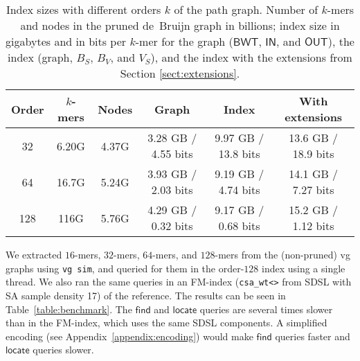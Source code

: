\documentclass[a4paper,UKenglish]{lipics-v2016}
\newcommand{\find}{\ensuremath{\mathsf{find}}}
\newcommand{\locate}{\ensuremath{\mathsf{locate}}}
\newcommand{\kmer}[1]{$#1$\nobreakdash-mer}
\newcommand{\orderk}[1]{order\nobreakdash-$#1$}
\newcommand{\BWT}{\ensuremath{\mathsf{BWT}}}
\newcommand{\bvIN}{\ensuremath{\mathsf{IN}}}
\newcommand{\bvOUT}{\ensuremath{\mathsf{OUT}}}
\begin{document}
\begin{table}[t!]
\begin{center}
\caption{Index sizes with different orders $k$ of the path graph. Number of \kmer{k}s and nodes in the pruned de~Bruijn graph in billions; index size in gigabytes and in bits per \kmer{k} for the graph ($\BWT$, $\bvIN$, and $\bvOUT$), the index (graph, $B_{S}$, $B_{V}$, and $V_{S}$), and the index with the extensions from Section \ref{sect:extensions}.}\label{table:indexes}
\begin{tabular}{c|cc|c|c|c}
\hline
\textbf{Order} & \textbf{\kmer{k}s} & \textbf{Nodes} & \textbf{Graph} & \textbf{Index} & \textbf{With extensions} \\
\hline
 32 & 6.20G & 4.37G & 3.28 GB / 4.55 bits & 9.97 GB / 13.8 bits & 13.6 GB / 18.9 bits \\
 64 & 16.7G & 5.24G & 3.93 GB / 2.03 bits & 9.19 GB / 4.74 bits & 14.1 GB / 7.27 bits \\
128 &  116G & 5.76G & 4.29 GB / 0.32 bits & 9.17 GB / 0.68 bits & 15.2 GB / 1.12 bits \\
\hline
\end{tabular}
\end{center}
\end{table}

We extracted \kmer{16}s, \kmer{32}s, \kmer{64}s, and \kmer{128}s from the (non-pruned) vg graphs using \texttt{vg sim}, and queried for them in the \orderk{128} index using a single thread. We also ran the same queries in an FM\nobreakdash-index (\texttt{csa\_wt<>} from SDSL with SA sample density 17) of the reference. The results can be seen in Table~\ref{table:benchmark}. The $\find$ and $\locate$ queries are several times slower than in the FM\nobreakdash-index, which uses the same SDSL components. A simplified encoding (see Appendix~\ref{appendix:encoding}) would make $\find$ queries faster and $\locate$ queries slower.
\end{document}
